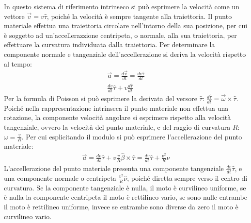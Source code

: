 \documentclass{article}
\numberwithin{equation}{subsection}
\begin{document}
In questo sistema di riferimento intrinseco si può esprimere la velocità come un vettore $\vec{v}=v\hat\tau$, poiché la velocità è sempre tangente alla traiettoria. Il punto 
materiale effettua una traiettoria circolare nell'intorno della sua posizione, per cui è soggetto ad un'accellerazzione centripeta, o normale, alla sua traiettoria, per 
effettuare la curvatura individuata dalla traiettoria. Per determinare la componente normale e tangenziale dell'accellerazione si deriva la velocità rispetto al tempo:
\begin{gather*}
    \vec{a}=\displaystyle\frac{d\vec{v}}{dt}=\frac{dv\hat\tau}{dt}\\
    \displaystyle\frac{dv}{dt}\hat\tau+v\frac{d\hat\tau}{dt}
\end{gather*}
Per la formula di Poisson si può esprimere la derivata del versore $\hat\tau$: $\displaystyle\frac{d\hat\tau}{dt}=\vec{\omega}\times\hat\tau$. Poiché nella rappresentazione 
intrinseca il punto materiale non effettua una rotazione, la componente velocità angolare si esprimere rispetto alla velocità tangenziale, ovvero la velocità del punto 
materiale, e del raggio di curvatura $R$: $\omega=\displaystyle\frac{v}{R}$. Per cui esplicitando il modulo si può esprimere l'accellerazione del punto materiale:
\begin{gather}
    \vec{a}=\displaystyle\frac{dv}{dt}\hat\tau+v\frac{v}{R}\hat\beta\times\hat\tau=\frac{dv}{dt}\hat\tau+\frac{v^2}{R}\hat\nu
\end{gather}
L'accellerazione del punto materiale presenta una componente tangenziale $\displaystyle\frac{dv}{dt}\hat\tau$, e una componente normale o centripeta $\displaystyle\frac{v^2}{R}\hat\nu$, 
poiché diretta sempre verso il centro di curvatura. Se la componente tangenziale è nulla, il moto è curvilineo uniforme, se è nulla la componente centripeta il moto è 
rettilineo vario, se sono nulle entrambe il moto è rettilineo uniforme, invece se entrambe sono diverse da zero il moto è curvilineo vario. 
\end{document}
